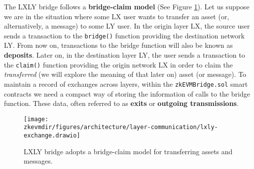 The LXLY bridge follows a \textbf{bridge-claim model} (See Figure \ref{fig:lxly-exchange}). Let us suppose we are in the situation where some LX user wants to transfer an asset (or, alternatively, a message) to some LY user. In the origin layer LX, the source user sends a transaction to the \texttt{bridge()} function providing the destination network LY. From now on, transactions to the bridge function will also be known as \textbf{deposits}. Later on, in the destination layer LY, the user sends a transaction to the \texttt{claim()} function providing the origin network LX in order to claim the \textit{transferred} (we will explore the meaning of that later on) asset (or message). To maintain a record of exchanges across layers, within the \texttt{zkEVMBridge.sol} smart contracts we need a compact way of storing the information of calls to the bridge function. These data, often referred to as \textbf{exits} or \textbf{outgoing transmissions}.

\begin{figure}[H]
\centering
\texttt{[image: \\zkevmdir/figures/architecture/layer-communication/lxly-exchange.drawio]}
\caption{LXLY bridge adopts a bridge-claim model for transferring assets and messages.}
\label{fig:lxly-exchange}
\end{figure}